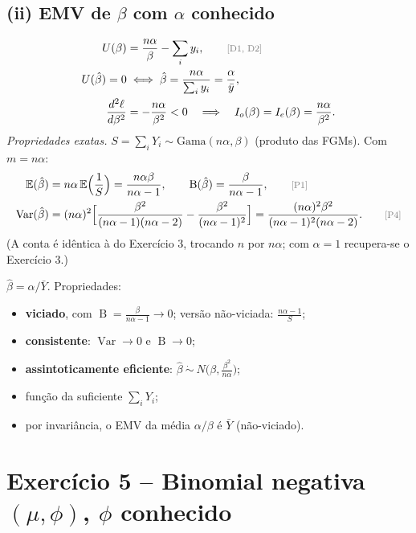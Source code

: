 \documentclass[11pt,a4paper]{article}
\newcommand{\E}{\mathbb{E}}
\newcommand{\Var}{\operatorname{Var}}
\newcommand{\B}{\operatorname{B}}
\newcommand{\bY}{\bar{Y}}
\newcommand{\just}[1]{\tag*{\footnotesize\textcolor{gray}{[#1]}}}
\theoremstyle{definition}
\theoremstyle{plain}
\begin{document}
\subsection*{(ii) EMV de $\beta$ com $\alpha$ conhecido}
\begin{align*}
U(\beta)&=\frac{n\alpha}{\beta}-\sum_iy_i, \just{D1, D2}\\
U(\hat\beta)=0&\iff\hat\beta=\frac{n\alpha}{\sum_iy_i}=\frac{\alpha}{\bar y},\\
\frac{d^2\ell}{d\beta^2}&=-\frac{n\alpha}{\beta^2}<0\quad\Longrightarrow\quad I_o(\beta)=I_e(\beta)=\frac{n\alpha}{\beta^2}.
\end{align*}
\textit{Propriedades exatas.} $S=\sum_iY_i\sim\text{Gama}(n\alpha,\beta)$ (produto das FGMs). Com $m=n\alpha$:
\begin{align*}
\E(\hat\beta)&=n\alpha\,\E\Big(\frac1S\Big)=\frac{n\alpha\beta}{n\alpha-1}, \qquad \B(\hat\beta)=\frac{\beta}{n\alpha-1}, \just{P1}\\
\Var(\hat\beta)&=(n\alpha)^2\Big[\frac{\beta^2}{(n\alpha-1)(n\alpha-2)}-\frac{\beta^2}{(n\alpha-1)^2}\Big]=\frac{(n\alpha)^2\beta^2}{(n\alpha-1)^2(n\alpha-2)}. \just{P4}
\end{align*}
(A conta é idêntica à do Exercício 3, trocando $n$ por $n\alpha$; com $\alpha=1$ recupera-se o Exercício 3.)
\begin{resposta}
$\hat\beta=\alpha/\bY$. Propriedades:
\begin{itemize}[leftmargin=1.2em]
\item \textbf{viciado}, com $\B=\frac{\beta}{n\alpha-1}\to0$; versão não-viciada: $\frac{n\alpha-1}{S}$;
\item \textbf{consistente}: $\Var\to0$ e $\B\to0$;
\item \textbf{assintoticamente eficiente}: $\hat\beta\ \dot\sim\ N\big(\beta,\frac{\beta^2}{n\alpha}\big)$;
\item função da suficiente $\sum_iY_i$;
\item por invariância, o EMV da média $\alpha/\beta$ é $\bY$ (não-viciado).
\end{itemize}
\end{resposta}

\section{Exercício 5 -- Binomial negativa $(\mu,\phi)$, $\phi$ conhecido}
\end{document}
